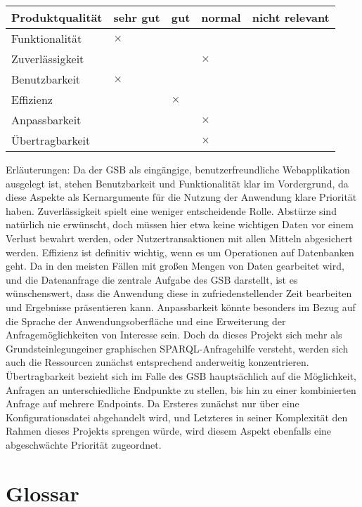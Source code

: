 \begin{table}[!h]
  \begin{tabular}{l l l l l}
\toprule
Produktqualität & sehr gut & gut & normal & nicht relevant \\\midrule

Funktionalität & $\times$ \\
Zuverlässigkeit &&& $\times$ \\
Benutzbarkeit &  $\times$ \\
Effizienz  && $\times$ \\
Anpassbarkeit &&& $\times$ \\
Übertragbarkeit &&& $\times$ \\
\bottomrule
\end{tabular}
\end{table}

Erläuterungen:
Da der GSB als eingängige, benutzerfreundliche Webapplikation ausgelegt ist, stehen Benutzbarkeit und Funktionalität klar im Vordergrund, da diese Aspekte als Kernargumente für die Nutzung der Anwendung klare Priorität haben.
Zuverlässigkeit spielt eine weniger entscheidende Rolle. Abstürze sind natürlich nie erwünscht, doch müssen hier etwa keine wichtigen Daten vor einem Verlust bewahrt werden, oder Nutzertransaktionen mit allen Mitteln abgesichert werden.
Effizienz ist definitiv wichtig, wenn es um Operationen auf Datenbanken geht. Da in den meisten Fällen mit großen Mengen von Daten gearbeitet wird, und die Datenanfrage die zentrale Aufgabe des GSB darstellt, ist es wünschenswert, dass die Anwendung diese in zufriedenstellender Zeit bearbeiten und Ergebnisse präsentieren kann.
Anpassbarkeit könnte besonders im Bezug auf die Sprache der Anwendungsoberfläche und eine Erweiterung der Anfragemöglichkeiten von Interesse sein. Doch da dieses Projekt sich mehr als \glqq Grundsteinlegung\grqq einer graphischen SPARQL-Anfragehilfe versteht, werden sich auch die Ressourcen zunächst entsprechend anderweitig konzentrieren.
Übertragbarkeit bezieht sich im Falle des GSB  hauptsächlich auf die Möglichkeit, Anfragen an unterschiedliche Endpunkte zu stellen, bis hin zu einer kombinierten Anfrage auf mehrere Endpoints. Da Ersteres zunächst nur über eine Konfigurationsdatei abgehandelt wird, und Letzteres in seiner Komplexität den Rahmen dieses Projekts sprengen würde, wird diesem Aspekt ebenfalls eine abgeschwächte Priorität zugeordnet.


\section{Glossar}

